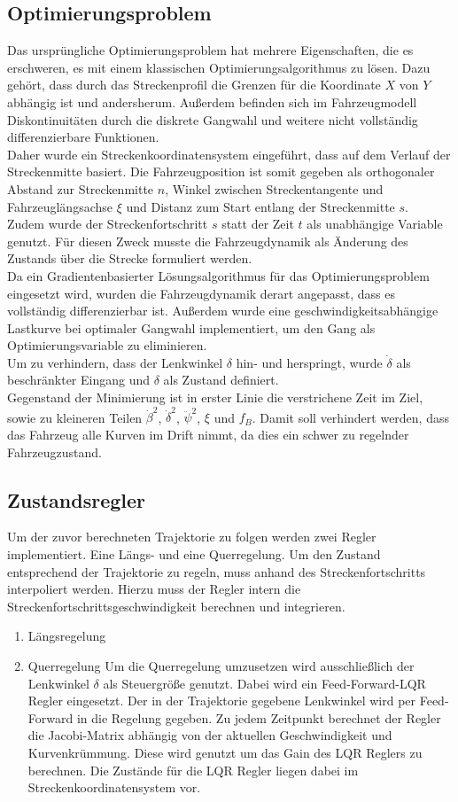 \documentclass[pdf]{ifacconf}
\begin{document}
\subsection{Optimierungsproblem}
Das ursprüngliche Optimierungsproblem hat mehrere Eigenschaften, die es erschweren, es mit einem klassischen Optimierungsalgorithmus zu lösen. Dazu gehört, dass durch das Streckenprofil die Grenzen für die Koordinate $X$ von $Y$ abhängig ist und andersherum. Außerdem befinden sich im Fahrzeugmodell Diskontinuitäten durch die diskrete Gangwahl  und weitere nicht vollständig differenzierbare Funktionen.\\
Daher wurde ein Streckenkoordinatensystem eingeführt, dass auf dem Verlauf der Streckenmitte basiert. Die Fahrzeugposition ist somit gegeben als orthogonaler Abstand zur Streckenmitte $n$, Winkel zwischen Streckentangente und Fahrzeuglängsachse $\xi$ und Distanz zum Start entlang der Streckenmitte $s$.\\ Zudem wurde der Streckenfortschritt $s$ statt der Zeit $t$ als unabhängige Variable genutzt. Für diesen Zweck musste die Fahrzeugdynamik als Änderung des Zustands über die Strecke formuliert werden.\\
Da ein Gradientenbasierter Lösungsalgorithmus für das Optimierungsproblem eingesetzt wird, wurden die Fahrzeugdynamik derart angepasst, dass es vollständig differenzierbar ist. Außerdem wurde eine geschwindigkeitsabhängige Lastkurve bei optimaler Gangwahl implementiert, um den Gang als Optimierungsvariable zu eliminieren.\\
Um zu verhindern, dass der Lenkwinkel $\delta$ hin- und herspringt, wurde $\dot{\delta}$ als beschränkter Eingang und $\delta$ als Zustand definiert.\\
Gegenstand der Minimierung ist in erster Linie die verstrichene Zeit im Ziel, sowie zu kleineren Teilen $\dot{\beta}^2$, $\dot{\delta}^2$, $\ddot{\psi}^2$, $\xi$ und $f_B$. Damit soll verhindert werden, dass das Fahrzeug alle Kurven im Drift nimmt, da dies ein schwer zu regelnder Fahrzeugzustand.
\subsection{Zustandsregler}
Um der zuvor berechneten Trajektorie zu folgen werden zwei Regler
implementiert. Eine Längs- und eine Querregelung. Um den Zustand entsprechend der Trajektorie zu regeln, muss anhand des Streckenfortschritts interpoliert werden. Hierzu muss der Regler intern die Streckenfortschrittsgeschwindigkeit berechnen und integrieren.
\begin{enumerate}
	\item Längsregelung
	\item Querregelung
	Um die Querregelung umzusetzen wird ausschließlich der Lenkwinkel $\delta$ als Steuergröße genutzt. Dabei wird ein Feed-Forward-LQR Regler eingesetzt. Der in der Trajektorie gegebene Lenkwinkel wird per Feed-Forward in die Regelung gegeben. Zu jedem Zeitpunkt berechnet der Regler die Jacobi-Matrix abhängig von der aktuellen Geschwindigkeit und Kurvenkrümmung. Diese wird genutzt um das Gain des LQR Reglers zu berechnen. Die Zustände für die LQR Regler liegen dabei im Streckenkoordinatensystem vor.
\end{enumerate}
\end{document}
